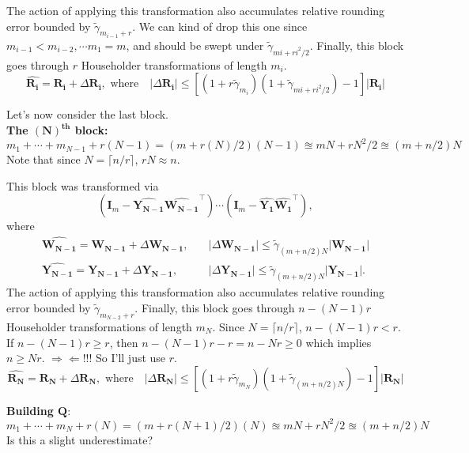 \documentclass[review,onefignum,onetabnum]{siamart190516}
\newcommand{\bb}[1]{\mathbf{#1}}
\begin{document}
The action of applying this transformation also accumulates relative rounding error bounded by $\tilde{\gamma}_{m_{i-1}+r}$.
We can kind of drop this one since $m_{i-1}<m_{i-2},\cdots m_1=m$, and should be swept under $\tilde{\gamma}_{mi+ri^2/2}$.
Finally, this block goes through $r$ Householder transformations of length $m_i$.
\[\boxed{ \hat{\bb{R_i}} = \bb{R_i}+\Delta\bb{R_i},\text{ where}\quad |\Delta\bb{R_i}| \leq\left[\left(1+ r\tilde{\gamma}_{
		m_i}\right)\left(1 + \tilde{\gamma}_{mi+ri^2/2}\right)-1\right]|\bb{R_i}|} 
\]

Let's now consider the last block.\\
\textbf{The $\mathbf{(N)^{th}}$ block: }
\begin{equation*}
		m_1+\cdots+m_{N-1}+r(N-1) = (m+r(N)/2)(N-1) \approxeq mN +rN^2/2 \approxeq (m+n/2)N
\end{equation*}
Note that since $N=\lceil n/r\rceil$, $rN \approx n$. 

 This block was transformed via $$(\bb{I}_m-\hat{\bb{Y_{N-1}}}\hat{{\bb{W_{N-1}}}}^{\top})\cdots (\bb{I}_m-\hat{\bb{Y_1}}\hat{{\bb{W_1}}}^{\top}),$$ where
\begin{align*}
\hat{\bb{W_{N-1}}} = \bb{W_{N-1}}+\Delta\bb{W_{N-1}},\quad &  |\Delta\bb{W_{N-1}}| \leq \tilde{\gamma}_{(m+n/2)N}|\bb{W_{N-1}}|  \\
\hat{\bb{Y_{N-1}}} = \bb{Y_{N-1}}+\Delta\bb{Y_{N-1}},\quad &  |\Delta\bb{Y_{N-1}}| \leq \tilde{\gamma}_{(m+n/2)N}|\bb{Y_{N-1}}|.
\end{align*}
The action of applying this transformation also accumulates relative rounding error bounded by $\tilde{\gamma}_{m_{N-2}+r}$.
Finally, this block goes through $n-(N-1)r$ Householder transformations of length $m_{N}$.
Since $N=\lceil n/r\rceil$, $n-(N-1)r <r$.\\
If $n-(N-1)r \geq r$, then $n-(N-1)r-r = n-Nr\geq 0$ which implies $n\geq Nr$. $\Rightarrow\Leftarrow$!!!
So I'll just use $r$. 
\[\boxed{ \hat{\bb{R_{N}}} = \bb{R_{N}}+\Delta\bb{R_{N}},\text{ where}\quad |\Delta\bb{R_{N}}| \leq\left[\left(1+ r\tilde{\gamma}_{
		m_{N}}\right)\left(1 + \tilde{\gamma}_{(m+n/2)N}\right)-1\right]|\bb{R_{N}}|} 
\]

\textbf{Building $\bb{Q}$}: 
\begin{equation*}
m_1+\cdots+m_{N}+r(N) = (m+r(N+1)/2)(N) \approxeq mN +rN^2/2 \approxeq (m+n/2)N
\end{equation*}
Is this a slight underestimate?
\end{document}
